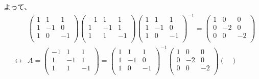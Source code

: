\documentclass[]{jsarticle}
\begin{document}
        よって、
        \begin{eqnarray}
            &&\begin{pmatrix}
                1 & 1 & 1 \\
                1 & -1 & 0 \\
                1 & 0 & -1 \\
            \end{pmatrix}
            \begin{pmatrix}
                -1 & 1 & 1 \\
                1 & -1 & 1 \\
                1 & 1 & -1 \\
            \end{pmatrix}
            \begin{pmatrix}
                1 & 1 & 1 \\
                1 & -1 & 0 \\
                1 & 0 & -1 \\
            \end{pmatrix}^{-1} =
            \begin{pmatrix}
                1 & 0 & 0 \\
                0 & -2 & 0 \\
                0 & 0 & -2 \\
            \end{pmatrix} \nonumber \\
            &\leftrightarrow& A = \begin{pmatrix}
                -1 & 1 & 1 \\
                1 & -1 & 1 \\
                1 & 1 & -1 \\
            \end{pmatrix} =
            \begin{pmatrix}
                1 & 1 & 1 \\
                1 & -1 & 0 \\
                1 & 0 & -1 \\
            \end{pmatrix}^{-1}
            \begin{pmatrix}
                1 & 0 & 0 \\
                0 & -2 & 0 \\
                0 & 0 & -2 \\
            \end{pmatrix}
            \begin{pmatrix}

\end{pmatrix}
\end{eqnarray}
\end{document}
